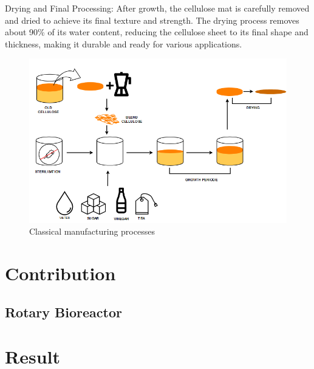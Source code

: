 Drying and Final Processing: After growth, the cellulose mat is carefully removed and dried to achieve its final texture and strength. The drying process removes about 90\% of its water content, reducing the cellulose sheet to its final shape and thickness, making it durable and ready for various applications.


\begin{figure}[h]
    \centering
    \includegraphics[width=1.2\textwidth]{images/SCOBY_diag.png}
    \caption{Classical manufacturing processes}
    \label{fig:manufacture}
\end{figure} 

\section{Contribution}

\subsection{Rotary Bioreactor}


\section{Result}

